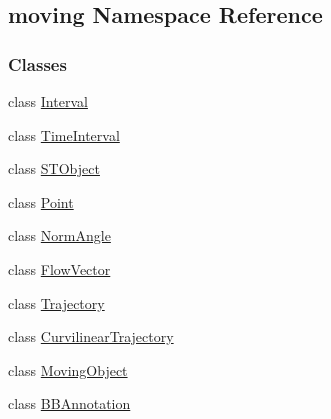 \hypertarget{namespacemoving}{\subsection{moving Namespace Reference}
\label{namespacemoving}
}
\subsubsection*{Classes}
\begin{DoxyCompactItemize}
\item 
class \hyperlink{classmoving_1_1Interval}{Interval}
\item 
class \hyperlink{classmoving_1_1TimeInterval}{Time\-Interval}
\item 
class \hyperlink{classmoving_1_1STObject}{S\-T\-Object}
\item 
class \hyperlink{classmoving_1_1Point}{Point}
\item 
class \hyperlink{classmoving_1_1NormAngle}{Norm\-Angle}
\item 
class \hyperlink{classmoving_1_1FlowVector}{Flow\-Vector}
\item 
class \hyperlink{classmoving_1_1Trajectory}{Trajectory}
\item 
class \hyperlink{classmoving_1_1CurvilinearTrajectory}{Curvilinear\-Trajectory}
\item 
class \hyperlink{classmoving_1_1MovingObject}{Moving\-Object}
\item 
class \hyperlink{classmoving_1_1BBAnnotation}{B\-B\-Annotation}
\end{DoxyCompactItemize}
